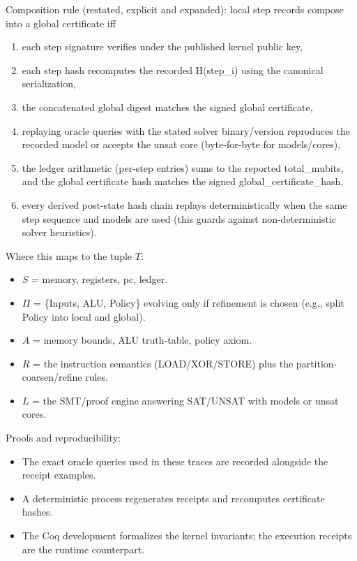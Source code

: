 \documentclass[11pt]{article}
\begin{document}
Composition rule (restated, explicit and expanded): local step records compose into a global certificate iff
\begin{enumerate}
  \item each step signature verifies under the published kernel public key,
  \item each step hash recomputes the recorded H(step\_i) using the canonical serialization,
  \item the concatenated global digest matches the signed global certificate,
  \item replaying oracle queries with the stated solver binary/version reproduces the recorded model or accepts the unsat core (byte-for-byte for models/cores),
  \item the ledger arithmetic (per-step entries) sums to the reported total_mubits, and the global certificate hash matches the signed global_certificate_hash,
  \item every derived post-state hash chain replays deterministically when the same step sequence and models are used (this guards against non-deterministic solver heuristics).
\end{enumerate}


Where this maps to the tuple $T$:
\begin{itemize}
  \item $S$ = memory, registers, pc, ledger.
  \item $\Pi$ = \{Inputs, ALU, Policy\} evolving only if refinement is chosen (e.g., split Policy into local and global).
  \item $A$ = memory bounds, ALU truth-table, policy axiom.
  \item $R$ = the instruction semantics (LOAD/XOR/STORE) plus the partition-coarsen/refine rules.
  \item $L$ = the SMT/proof engine answering SAT/UNSAT with models or unsat cores.
\end{itemize}

Proofs and reproducibility:
\begin{itemize}
  \item The exact oracle queries used in these traces are recorded alongside the receipt examples.
  \item A deterministic process regenerates receipts and recomputes certificate hashes.
  \item The Coq development formalizes the kernel invariants; the execution receipts are the runtime counterpart.
\end{itemize}
\end{document}
